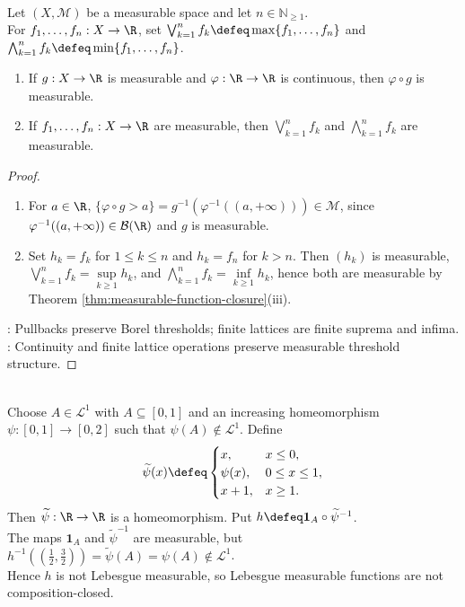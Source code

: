 \begin{corollary} \label{cor:continuous-composition-and-finite-lattice-measurable} \\
Let $(X,\mathcal{M})$ be a measurable space and let $n\in\mathbb{N}_{\geq1}$.\\
For $f_1,\ldots,f_n:X\to\R$, set $\bigvee_{k=1}^{n}f_k\defeq\max\{f_1,\ldots,f_n\}$ and $\bigwedge_{k=1}^{n}f_k\defeq\min\{f_1,\ldots,f_n\}$.
\begin{enumerate}[label=(\roman*)]
\setlength{\itemsep}{0pt}
\item If $g:X\to\R$ is measurable and $\varphi:\R\to\R$ is continuous, then $\varphi\circ g$ is measurable.
\item If $f_1,\ldots,f_n:X\to\R$ are measurable, then $\bigvee_{k=1}^{n}f_k$ and $\bigwedge_{k=1}^{n}f_k$ are measurable.
\end{enumerate}
\begin{proof}
\begin{enumerate}[label=(\roman*)]
\setlength{\itemsep}{0pt}
\item For $a\in\R$, $\{\varphi\circ g>a\}=g^{-1}(\varphi^{-1}((a,+\infty)))\in\mathcal{M}$, since $\varphi^{-1}((a,+\infty))\in\mathcal{B}(\R)$ and $g$ is measurable.
\item Set $h_k=f_k$ for $1\leq k\leq n$ and $h_k=f_n$ for $k>n$. Then $(h_k)$ is measurable, $\bigvee_{k=1}^{n}f_k=\sup\limits_{k\geq1}h_k$, and $\bigwedge_{k=1}^{n}f_k=\inf\limits_{k\geq1}h_k$, hence both are measurable by Theorem \ref{thm:measurable-function-closure}(iii).
\end{enumerate}
: Pullbacks preserve Borel thresholds; finite lattices are finite suprema and infima.\\
: Continuity and finite lattice operations preserve measurable threshold structure.
\end{proof}
\end{corollary}

\begin{example} \label{ex:measurable-composition-can-fail} \\
Choose $A\in\mathcal{L}^1$ with $A\subseteq[0,1]$ and an increasing homeomorphism $\psi:[0,1]\to[0,2]$ such that $\psi(A)\notin\mathcal{L}^1$. Define
\begin{equation*}
\widetilde{\psi}(x)\defeq
\begin{cases}
x,&x\leq0,\\
\psi(x),&0\leq x\leq1,\\
x+1,&x\geq1.
\end{cases}
\end{equation*}
Then $\widetilde{\psi}:\R\to\R$ is a homeomorphism. Put $h\defeq\mathbf{1}_A\circ\widetilde{\psi}^{-1}$.\\
The maps $\mathbf{1}_A$ and $\widetilde{\psi}^{-1}$ are measurable, but $h^{-1}((\frac{1}{2},\frac{3}{2}))=\widetilde{\psi}(A)=\psi(A)\notin\mathcal{L}^1$.\\
Hence $h$ is not Lebesgue measurable, so Lebesgue measurable functions are not composition-closed.
\end{example}

